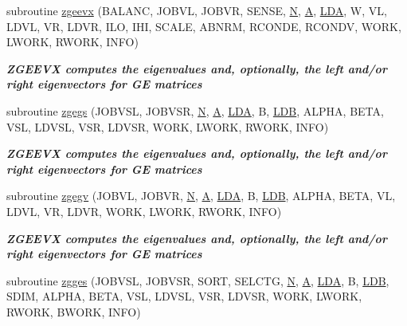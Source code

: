 \begin{DoxyCompactItemize}
subroutine \hyperlink{group__complex16GEeigen_gae55acf82651540f7d8f36715eec0900d}{zgeevx} (B\+A\+L\+A\+N\+C, J\+O\+B\+V\+L, J\+O\+B\+V\+R, S\+E\+N\+S\+E, \hyperlink{polmisc_8c_a0240ac851181b84ac374872dc5434ee4}{N}, \hyperlink{classA}{A}, \hyperlink{example__user_8c_ae946da542ce0db94dced19b2ecefd1aa}{L\+D\+A}, W, V\+L, L\+D\+V\+L, V\+R, L\+D\+V\+R, I\+L\+O, I\+H\+I, S\+C\+A\+L\+E, A\+B\+N\+R\+M, R\+C\+O\+N\+D\+E, R\+C\+O\+N\+D\+V, W\+O\+R\+K, L\+W\+O\+R\+K, R\+W\+O\+R\+K, I\+N\+F\+O)
\begin{DoxyCompactList}\small\item\em {\bfseries  Z\+G\+E\+E\+V\+X computes the eigenvalues and, optionally, the left and/or right eigenvectors for G\+E matrices} \end{DoxyCompactList}\item 
subroutine \hyperlink{group__complex16GEeigen_gad43ce2e0f0453844b8ff88c5dfe30b13}{zgegs} (J\+O\+B\+V\+S\+L, J\+O\+B\+V\+S\+R, \hyperlink{polmisc_8c_a0240ac851181b84ac374872dc5434ee4}{N}, \hyperlink{classA}{A}, \hyperlink{example__user_8c_ae946da542ce0db94dced19b2ecefd1aa}{L\+D\+A}, B, \hyperlink{example__user_8c_a50e90a7104df172b5a89a06c47fcca04}{L\+D\+B}, A\+L\+P\+H\+A, B\+E\+T\+A, V\+S\+L, L\+D\+V\+S\+L, V\+S\+R, L\+D\+V\+S\+R, W\+O\+R\+K, L\+W\+O\+R\+K, R\+W\+O\+R\+K, I\+N\+F\+O)
\begin{DoxyCompactList}\small\item\em {\bfseries  Z\+G\+E\+E\+V\+X computes the eigenvalues and, optionally, the left and/or right eigenvectors for G\+E matrices} \end{DoxyCompactList}\item 
subroutine \hyperlink{group__complex16GEeigen_ga16024be7f650b57a748b1947d64adbe5}{zgegv} (J\+O\+B\+V\+L, J\+O\+B\+V\+R, \hyperlink{polmisc_8c_a0240ac851181b84ac374872dc5434ee4}{N}, \hyperlink{classA}{A}, \hyperlink{example__user_8c_ae946da542ce0db94dced19b2ecefd1aa}{L\+D\+A}, B, \hyperlink{example__user_8c_a50e90a7104df172b5a89a06c47fcca04}{L\+D\+B}, A\+L\+P\+H\+A, B\+E\+T\+A, V\+L, L\+D\+V\+L, V\+R, L\+D\+V\+R, W\+O\+R\+K, L\+W\+O\+R\+K, R\+W\+O\+R\+K, I\+N\+F\+O)
\begin{DoxyCompactList}\small\item\em {\bfseries  Z\+G\+E\+E\+V\+X computes the eigenvalues and, optionally, the left and/or right eigenvectors for G\+E matrices} \end{DoxyCompactList}\item 
subroutine \hyperlink{group__complex16GEeigen_ga788ffb82ac609cc3e99de43c4cea3e7b}{zgges} (J\+O\+B\+V\+S\+L, J\+O\+B\+V\+S\+R, S\+O\+R\+T, S\+E\+L\+C\+T\+G, \hyperlink{polmisc_8c_a0240ac851181b84ac374872dc5434ee4}{N}, \hyperlink{classA}{A}, \hyperlink{example__user_8c_ae946da542ce0db94dced19b2ecefd1aa}{L\+D\+A}, B, \hyperlink{example__user_8c_a50e90a7104df172b5a89a06c47fcca04}{L\+D\+B}, S\+D\+I\+M, A\+L\+P\+H\+A, B\+E\+T\+A, V\+S\+L, L\+D\+V\+S\+L, V\+S\+R, L\+D\+V\+S\+R, W\+O\+R\+K, L\+W\+O\+R\+K, R\+W\+O\+R\+K, B\+W\+O\+R\+K, I\+N\+F\+O)

\end{DoxyCompactItemize}
